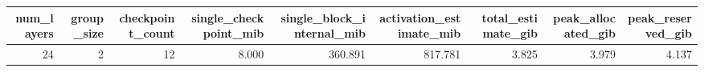 \begin{tabular}{rrrrrrrrr}
\toprule
num\_layers & group\_size & checkpoint\_count & single\_checkpoint\_mib & single\_block\_internal\_mib & activation\_estimate\_mib & total\_estimate\_gib & peak\_allocated\_gib & peak\_reserved\_gib \\
\midrule
24 & 2 & 12 & 8.000 & 360.891 & 817.781 & 3.825 & 3.979 & 4.137 \\
\bottomrule
\end{tabular}
